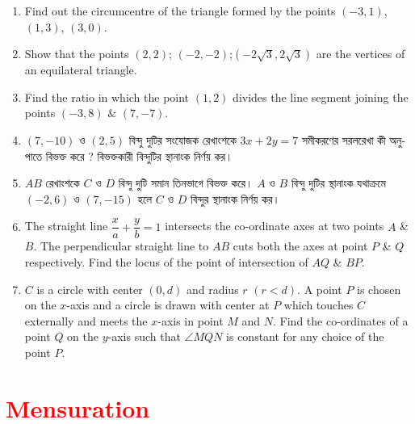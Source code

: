\documentclass[11pt, a4paper]{article}
\begin{document}
\begin{enumerate}


	\item Find out the circumcentre of the triangle formed by the points $(-3,1)$, $(1,3)$, $(3,0)$.
	
	\item Show that the points $ (2,2) $; $(-2,-2)$;$(-2\sqrt{3},2\sqrt{3})$ are the vertices of an equilateral triangle.
	
	\item Find the ratio in which the point $(1,2)$ divides the line segment joining the points $(-3,8)$ $\&$ $(7,-7)$.
	
	\item $(7, -10)$ \textbengali{ও} $(2, 5)$  \textbengali{বিন্দু দুটির সংযোজক রেখাংশকে}  $3x + 2y = 7$ \textbengali{সমীকরণের সরলরেখা কী অনুপাতে বিভক্ত করে ? বিভক্তকারী বিন্দুটির স্থানাংক নির্ণয় কর।}
	
	\item $AB$ \textbengali{রেখাংশকে} $C$ \textbengali{ও} $D$ \textbengali{বিন্দু দুটি সমান তিনভাগে বিভক্ত করে।} $A$ \textbengali{ও} $B$ \textbengali{বিন্দু দুটির স্থানাংক যথাক্রমে} $(-2, 6)$ \textbengali{ও} $(7, -15)$ \textbengali{হলে} $C$ \textbengali{ও} $D$ \textbengali{বিন্দুর স্থানাংক নির্ণয় কর।}
	
	\item The straight line $\dfrac{x}{a} + \dfrac{y}{b} = 1$ intersects the co-ordinate axes at two points $A$ \& $B$. The perpendicular straight line to $AB$ cuts both the axes at point $P$ \& $Q$ respectively. Find the locus of the point of intersection of $AQ$ \& $BP$.
	
	\item $C$ is a circle with center $(0,d)$ and radius $r$ $(r<d)$. A point $P$ is chosen on the $x$-axis and a circle is drawn with center at $P$ which touches $C$ externally and meets the $x$-axis in point $M$ and $N$. Find the co-ordinates of a point $Q$ on the $y$-axis such that $\angle MQN$ is constant for any choice of the point $P$.
	

\end{enumerate}



\section{\textcolor{red}{Mensuration}}
\end{document}

